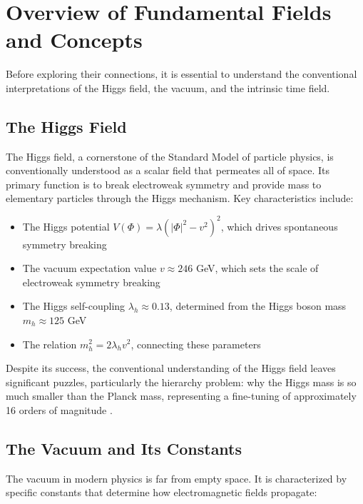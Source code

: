 \documentclass[12pt,a4paper]{article}
\begin{document}
	\section{Overview of Fundamental Fields and Concepts}
	\label{sec:fields_overview}
	
	Before exploring their connections, it is essential to understand the conventional interpretations of the Higgs field, the vacuum, and the intrinsic time field.
	
	\subsection{The Higgs Field}
	\label{subsec:higgs_field}
	
	The Higgs field, a cornerstone of the Standard Model of particle physics, is conventionally understood as a scalar field that permeates all of space. Its primary function is to break electroweak symmetry and provide mass to elementary particles through the Higgs mechanism. Key characteristics include:
	
	\begin{itemize}
		\item The Higgs potential $V(\Phi) = \lambda(|\Phi|^2 - v^2)^2$, which drives spontaneous symmetry breaking
		\item The vacuum expectation value $v \approx 246$ GeV, which sets the scale of electroweak symmetry breaking
		\item The Higgs self-coupling $\lambda_h \approx 0.13$, determined from the Higgs boson mass $m_h \approx 125$ GeV
		\item The relation $m_h^2 = 2\lambda_h v^2$, connecting these parameters
	\end{itemize}
	
	Despite its success, the conventional understanding of the Higgs field leaves significant puzzles, particularly the hierarchy problem: why the Higgs mass is so much smaller than the Planck mass, representing a fine-tuning of approximately 16 orders of magnitude \cite{Weinberg1989}.
	
	\subsection{The Vacuum and Its Constants}
	\label{subsec:vacuum}
	
	The vacuum in modern physics is far from empty space. It is characterized by specific constants that determine how electromagnetic fields propagate:
	
\end{document}
